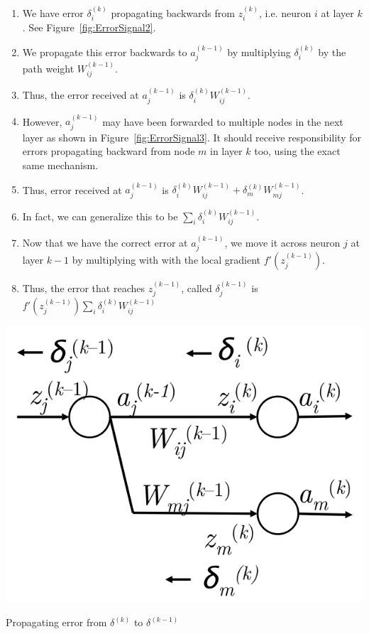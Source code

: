 \documentclass{tufte-handout}
\begin{document}
\begin{enumerate}
\item We have error $\delta^{(k)}_i$ propagating backwards from $z^{(k)}_i$, i.e. neuron $i$ at layer $k$. See Figure~\ref{fig:ErrorSignal2}.
\item We propagate this error backwards to $a^{(k-1)}_j$ by multiplying $\delta^{(k)}_i$ by the path weight $W^{(k-1)}_{ij}$.
\item Thus, the error received at $a^{(k-1)}_j$ is $\delta^{(k)}_i W^{(k-1)}_{ij}$.
\item However, $a^{(k-1)}_j$ may have been forwarded to multiple nodes in the next layer as shown in Figure~\ref{fig:ErrorSignal3}. It should receive responsibility for errors propagating backward from node $m$ in layer $k$ too, using the exact same mechanism.
\item Thus, error received at $a^{(k-1)}_j$ is $\delta^{(k)}_i W^{(k-1)}_{ij} + \delta^{(k)}_m W^{(k-1)}_{mj}$.
\item In fact, we can generalize this to be $\sum_i \delta^{(k)}_i W^{(k-1)}_{ij}$.
\item Now that we have the correct error at $a^{(k-1)}_j$, we move it across neuron $j$ at layer $k-1$ by multiplying with with the local gradient $f'(z_j^{(k-1)})$.
\item Thus, the error that reaches $z_j^{(k-1)}$, called $\delta_j^{(k-1)}$ is \\$f'(z_j^{(k-1)}) \sum_i \delta^{(k)}_i W^{(k-1)}_{ij}$
\end{enumerate}

\begin{marginfigure}%
  \includegraphics[width=\linewidth]{ErrorSignal3}
  \caption{Propagating error from $\delta^{(k)}$ to $\delta^{(k-1)}$}
  \label{fig:ErrorSignal3}
\end{marginfigure}
\end{document}
